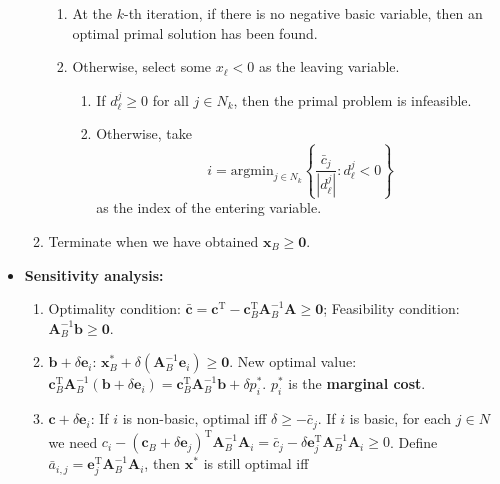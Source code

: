 \documentclass[10pt]{article}
\newcommand{\abs}[1]{\left\lvert#1\right\rvert}
\begin{document}
\begin{multicols*}{3}
\begin{itemize}
\begin{enumerate}
\begin{enumerate}
                    \item At the $k$-th iteration, if there is no negative basic variable, then an optimal primal solution has been found.
                    \item Otherwise, select some $x_{\ell} < 0$ as the leaving variable.
                    \begin{enumerate}
                        \item If $d^j_{\ell} \geq 0$ for all $j \in N_k$, then the primal problem is infeasible. 
                        \item Otherwise, take 
                        \begin{equation*}
                            i = \mathrm{argmin}_{j \in N_k}\left\{\frac{\bar{c}_j}{\abs{d^j_{\ell}}} \colon d^j_{\ell} < 0\right\}
                        \end{equation*}
                        as the index of the entering variable.
                    \end{enumerate}
                \end{enumerate}
                \item Terminate when we have obtained $\bm{x}_B \geq \mathbf{0}$.   
            \end{enumerate}
            \item \textbf{Sensitivity analysis:}
            \begin{enumerate}
                \item Optimality condition: $\bm{\bar{c}} = \bm{c}^{\mathrm{T}} - \bm{c}_B^{\mathrm{T}}\bm{A}_B^{-1}\bm{A} \geq \mathbf{0}$; Feasibility condition: $\bm{A}_B^{-1}\bm{b} \geq \mathbf{0}$.
                \item $\bm{b} + \delta\bm{e}_i$: $\bm{x}_B^* + \delta\left(\bm{A}_B^{-1}\bm{e}_i\right) \geq \mathbf{0}$. New optimal value: $\bm{c}^{\mathrm{T}}_B\bm{A}_B^{-1}\left(\bm{b} + \delta\bm{e}_i\right) = \bm{c}^{\mathrm{T}}_B\bm{A}_B^{-1}\bm{b} + \delta p^*_i$. $p^*_i$ is the \textbf{marginal cost}.
                \item $\bm{c} + \delta\bm{e}_i$: If $i$ is non-basic, optimal iff $\delta \geq -\bar{c}_j$. If $i$ is basic, for each $j \in N$ we need $c_i - \left(\bm{c}_B + \delta\bm{e}_j\right)^{\mathrm{T}}\bm{A}_B^{-1}\bm{A}_i = \bar{c}_j - \delta\bm{e}_j^{\mathrm{T}}\bm{A}_B^{-1}\bm{A}_i \geq 0$. Define $\bar{a}_{i, j} = \bm{e}_j^{\mathrm{T}}\bm{A}_B^{-1}\bm{A}_i$, then $\bm{x}^*$ is still optimal iff
                \begin{equation*}

\end{equation*}
\end{enumerate}
\end{itemize}
\end{multicols*}
\end{document}
